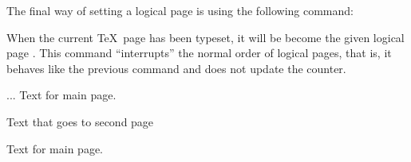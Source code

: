 The final way of setting a logical page is using the following
command: 

\begin{command}{\pgfpagescurrentpagewillbelogicalpage{}}
  When the current \TeX\ page has been typeset, it will be become the given
  logical page . This command ``interrupts'' the normal
  order of logical pages, that is, it behaves like the previous
  command and does not update the  
  counter. 

\begin{codeexample}
...
Text for main page.
\clearpage

Text that goes to second page
\clearpage

Text for main page.
\end{codeexample}
\end{command}

